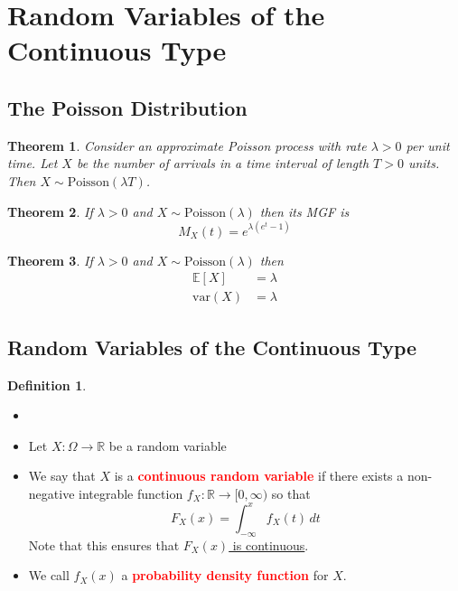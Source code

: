 \documentclass{article}
\newcommand{\R}{\mathbb{R}}
\newcommand{\E}{\mathbb{E}}
\newcommand{\var}{\text{var}}
\newcommand{\bfred}[1]{\textcolor{red}{\textbf{#1}}}
\theoremstyle{plain}
\newtheorem{thm}{Theorem}[section]
\theoremstyle{definition}
\newtheorem{defn}{Definition}[section]
\theoremstyle{remark}
\begin{document}
\section{Random Variables of the Continuous Type}

\subsection{The Poisson Distribution}

\begin{thm}
    Consider an approximate Poisson process with rate $\lambda > 0$ per unit time. Let $X$ be the number of arrivals in a time interval of length $T>0$ units. Then $X \sim \text{Poisson}(\lambda T)$.
\end{thm}

\begin{thm}
    If $\lambda > 0$ and $X \sim \text{Poisson}(\lambda)$ then its MGF is \[M_X(t) = e^{\lambda(e^t-1)}\]
\end{thm}

\begin{thm}
    If $\lambda>0$ and $X \sim \text{Poisson}(\lambda)$ then
    \begin{align*}
        \E[X]&=\lambda \\
        \var(X)&=\lambda
    \end{align*}
\end{thm}

\subsection{Random Variables of the Continuous Type}

\begin{defn}
    \begin{itemize}
        \item []
        \item Let $X: \Omega \rightarrow \R$ be a random variable
        \item We say that $X$ is a \bfred{continuous random variable} if there exists a non-negative integrable function $f_X:\R\rightarrow[0,\infty)$ so that \[F_X(x)=\int_{-\infty}^xf_X(t)\,dt\] Note that this ensures that \underline{$F_X(x)$ is continuous}.
        \item We call $f_X(x)$ a \bfred{probability density function} for $X$.
    \end{itemize}
\end{defn}
\end{document}
